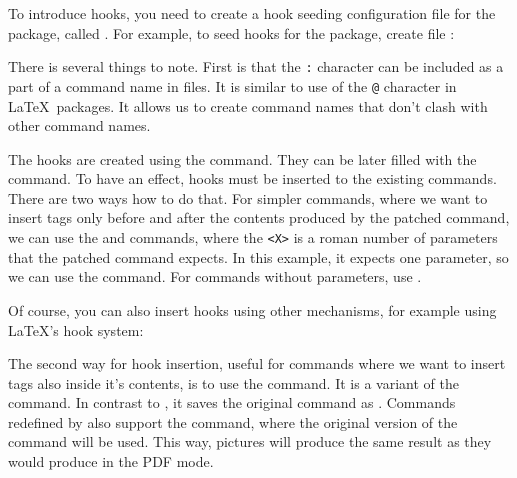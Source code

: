 To introduce hooks, you need to create a hook seeding configuration file for the package,
called . For example, to seed hooks for the  package, create file
:


There is several things to note. First is that the \verb|:| character 
can be included as a part of a command name in  files. It is similar
to use of the \verb|@| character in \LaTeX\ packages. It allows us to 
create command names that don't clash with other command names.

The hooks are created using the  command. They can be
later filled with the  command. To have an effect, hooks
must be inserted to the existing commands. There are two ways how to do that.
For simpler commands, where we want to insert tags only before and after 
the contents produced by the patched command, we can use the  and 
 commands, where the \verb|<X>| is a roman number of parameters
that the patched command expects. In this example, it expects one parameter, 
so we can use the  command. For commands without parameters, use 
.

Of course, you can also insert hooks using other mechanisms, for example using
\LaTeX's hook system:

\begin{texsource}
\end{texsource}

The second way for hook insertion, useful for commands where we want to insert
tags also inside it's contents, is to use the  command. It is a
variant of the  command.  In contrast to , it saves the
original command as .  Commands redefined by 
also support the  command, where the original version of the
command will be used. This way, pictures will produce the same result as they
would produce in the PDF mode.

